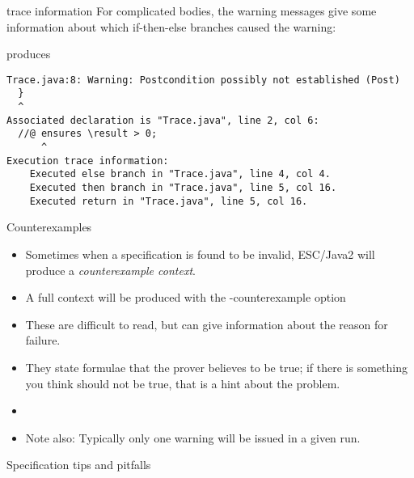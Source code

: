\documentclass[
pdf,
nocolorBG,
slideColor,
cok,
]{prosper}
\newcommand{\bsl}{\char'134}
\newcommand{\result}{\bsl result}
\begin{document}
\begin{slide}{trace information}
\vspace*{-9ex}
For complicated bodies, the warning messages give some information about which
if-then-else branches caused the warning:
\begin{figure*}
\tiny

\end{figure*}
\vspace*{-2ex}
produces
\tiny
\begin{verbatim}
Trace.java:8: Warning: Postcondition possibly not established (Post)
  }
  ^
Associated declaration is "Trace.java", line 2, col 6:
  //@ ensures \result > 0;
      ^
Execution trace information:
    Executed else branch in "Trace.java", line 4, col 4.
    Executed then branch in "Trace.java", line 5, col 16.
    Executed return in "Trace.java", line 5, col 16.
\end{verbatim}
\end{slide}

\begin{slide}{Counterexamples}
\vspace*{-6ex}
\begin{itemize}
\item Sometimes when a specification is found to be invalid, ESC/Java2 will produce a 
{\it counterexample context}.
\item A full context will be produced with the {\knalblue -counterexample} option
\item These are difficult to read, but can give information about the reason for failure.
\item They state formulae that the prover believes to be true; if there is something you think should
not be true, that is a hint about the problem.
\item[]
\item Note also: Typically only one warning will be issued in a given run.
\end{itemize}
\end{slide}


\begin{slide}{}

\vspace*{0ex}
\begin{center}{\large \red Specification tips and pitfalls}\end{center}
\end{slide}
\end{document}
